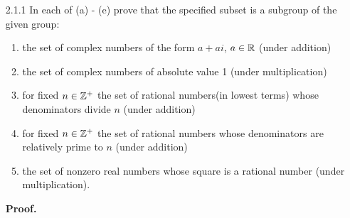 \begin{enumerate}
   \item[2.1.1]   In each of (a) - (e) prove that the specified subset is a
                  subgroup of the given group:
                  \begin{enumerate}
                     \item the set of complex numbers of the form $a + ai$,
                           $a \in \mathbb{R}$ (under addition)
                     \item the set of complex numbers of absolute value 1 (under
                           multiplication)
                     \item for fixed $n \in \mathbb{Z}^+$ the set of rational numbers(in
                           lowest terms) whose denominators divide $n$
                           (under addition)
                     \item for fixed $n \in \mathbb{Z}^+$ the set of rational numbers
                           whose denominators are relatively prime to $n$ (under
                           addition)
                     \item the set of nonzero real numbers whose square is a
                           rational number (under multiplication).
                  \end{enumerate}
                  
      \textbf{Proof.}
      

\end{enumerate}
